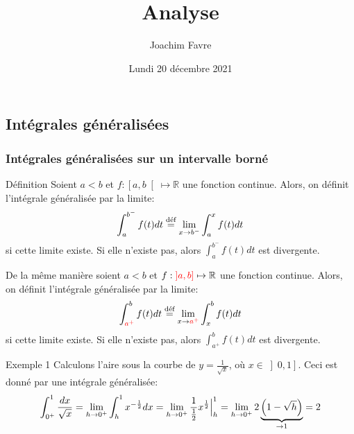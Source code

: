 \documentclass[a4paper]{article}
\title{Analyse}
\author{Joachim Favre}
\date{Lundi 20 décembre 2021}
\begin{document}
\maketitle


\subsection{Intégrales généralisées}
\subsubsection{Intégrales généralisées sur un intervalle borné}
\begin{parag}{Définition}
    Soient $a < b$  et $f: \left[a, b\right[  \mapsto \mathbb{R}$ une fonction continue. Alors, on définit l'intégrale généralisée par la limite: 
    \[\int_{a}^{b^-} f\left(t\right)dt \over{=}{déf} \lim_{x \to b^-} \int_{a}^{x} f\left(t\right)dt\]
    si cette limite existe. Si elle n'existe pas, alors $\int_{a}^{b^-} f\left(t\right)dt$ est divergente.
    
    De la même manière soient $a < b$  et $f: {\color{red}\left]a, b\right]}  \mapsto \mathbb{R}$ une fonction continue. Alors, on définit l'intégrale généralisée par la limite:
    \[\int_{{\color{red}a^+}}^{b} f\left(t\right)dt \over{=}{déf} \lim_{x \to {\color{red}a^+}} \int_{x}^{b} f\left(t\right)dt\]
    si cette limite existe. Si elle n'existe pas, alors $\int_{a^+}^{b} f\left(t\right)dt$ est divergente.
\end{parag}

\begin{parag}{Exemple 1}
    Calculons l'aire sous la courbe de $y = \frac{1}{\sqrt{x}}$, où $x \in \left]0, 1\right] $. Ceci est donné par une intégrale généralisée: 
    \[\int_{0^+}^{1} \frac{dx}{\sqrt{x}} = \lim_{h \to 0^+} \int_{h}^{1} x^{-\frac{1}{2}} dx = \lim_{h \to 0^+} \frac{1}{\frac{1}{2}} x^{\frac{1}{2}} \eval_{h}^{1} = \lim_{h \to 0^+} 2\underbrace{\left(1 - \sqrt{h}\right)}_{\to 1} = 2\]
\end{parag}
\end{document}
